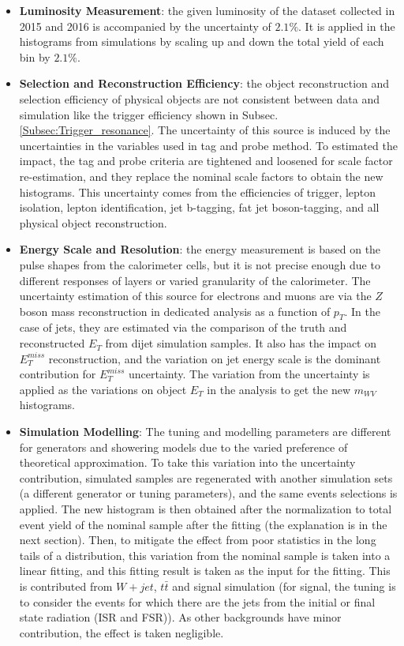 \begin{itemize}
	\item{\bf Luminosity Measurement}: the given luminosity of the dataset collected in 2015 and 2016 is accompanied by the uncertainty of $2.1\%$. It is applied in the histograms from simulations by scaling up and down the total yield of each bin by $2.1\%$.

	\item{\bf Selection and Reconstruction Efficiency}: the object reconstruction and selection efficiency of physical objects are not consistent between data and simulation like the trigger efficiency shown in Subsec. \ref{Subsec:Trigger_resonance}. The uncertainty of this source is induced by the uncertainties in the variables used in tag and probe method. To estimated the impact, the tag and probe criteria are tightened and loosened for scale factor re-estimation, and they replace the nominal scale factors to obtain the new histograms. This uncertainty comes from the efficiencies of trigger, lepton isolation, lepton identification, jet b-tagging, fat jet boson-tagging, and all physical object reconstruction. 

	\item{\bf Energy Scale and Resolution}: the energy measurement is based on the pulse shapes from the calorimeter cells, but it is not precise enough due to different responses of layers or varied granularity of the calorimeter. The uncertainty estimation of this source for electrons and muons are via the $Z$ boson mass reconstruction in dedicated analysis as a function of $p_{T}$. In the case of jets, they are estimated via the comparison of the truth and reconstructed $E_{T}$ from dijet simulation samples. It also has the impact on $E^{miss}_{T}$ reconstruction, and the variation on jet energy scale is the dominant contribution for $E^{miss}_{T}$ uncertainty. The variation from the uncertainty is applied as the variations on object $E_T$ in the analysis to get the new $m_{WV}$ histograms.

	\item{\bf Simulation Modelling}: The tuning and modelling parameters are different for generators and showering models due to the varied preference of theoretical approximation. To take this variation into the uncertainty contribution, simulated samples are regenerated with another simulation sets (a different generator or tuning parameters), and the same events selections is applied. The new histogram is then obtained after the normalization to total event yield of the nominal sample after the fitting (the explanation is in the next section). Then, to mitigate the effect from poor statistics in the long tails of a distribution, this variation from the nominal sample is taken into a linear fitting, and this fitting result is taken as the input for the fitting. This is contributed from $W+jet$, $t\bar{t}$ and signal simulation (for signal, the tuning is to consider the events for which there are the jets from the initial or final state radiation (ISR and FSR)). As other backgrounds have minor contribution, the effect is taken negligible. 


\end{itemize}
